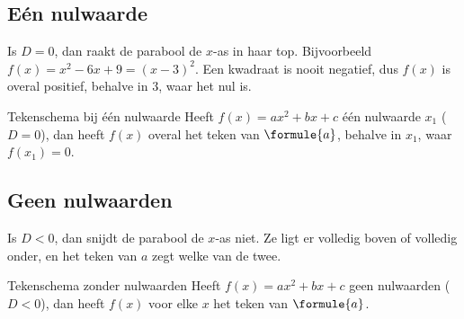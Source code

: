 \subsection{Eén nulwaarde}

Is $D = 0$, dan raakt de parabool de $x$-as in haar top. Bijvoorbeeld $f(x) = x^2 - 6x + 9 = (x - 3)^2$. Een kwadraat is nooit negatief, dus $f(x)$ is overal positief, behalve in $3$, waar het nul is.

\begin{theorie}
\begin{stelling}{Tekenschema bij één nulwaarde}
Heeft $f(x) = ax^2 + bx + c$ één nulwaarde $x_1$ ($D = 0$), dan heeft $f(x)$ overal het teken van $\formule{a}$, behalve in $x_1$, waar $f(x_1) = 0$.
\end{stelling}
\end{theorie}


\subsection{Geen nulwaarden}

Is $D < 0$, dan snijdt de parabool de $x$-as niet. Ze ligt er volledig boven of volledig onder, en het teken van $a$ zegt welke van de twee.

\begin{theorie}
\begin{stelling}{Tekenschema zonder nulwaarden}
Heeft $f(x) = ax^2 + bx + c$ geen nulwaarden ($D < 0$), dan heeft $f(x)$ voor elke $x$ het teken van $\formule{a}$.
\end{stelling}
\end{theorie}


